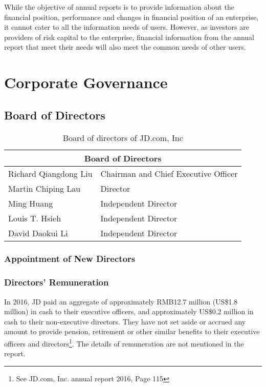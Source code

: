 While the objective of annual reports is to provide information about the financial position, performance and changes in financial position of an enterprise, it cannot cater to all the information needs of users. However, as investors are providers of risk capital to the enterprise, financial information from the annual report that meet their needs will also meet the common needs of other users.

\section{Corporate Governance}
\subsection{Board of Directors}

\begin{table}[H]	
\begin{center}
\begin{tabular}{ |l|l| }
	\hline
	\multicolumn{2}{|c|}{\textbf{Board of Directors}} \\
	\hline
	Richard Qiangdong Liu	&		Chairman and Chief Executive Officer \\
	\rowcolor[gray]{.95}
	Martin Chiping Lau		& 		Director\\
	Ming Huang				&		Independent Director \\
	\rowcolor[gray]{.95}
	Louis T. Hsieh			&		Independent Director \\
	David Daokui Li			&		Independent Director \\
	\hline
\end{tabular}
\end{center}
\caption{Board of directors of JD.com, Inc}\label{table:1}
\end{table}


	
 
\subsubsection{Appointment of New Directors}
\subsubsection{Directors’ Remuneration}
In 2016, JD paid an aggregate of approximately RMB12.7 million (US\$1.8 million) in cash to their executive officers, and approximately US\$0.2 million in cash to their non-executive directors. They have not set aside or accrued any amount to provide pension, retirement or other similar benefits to their executive officers and directors\footnote{See JD.com, Inc. annual report 2016, Page 115}.
The details of remuneration are not mentioned in the report.

